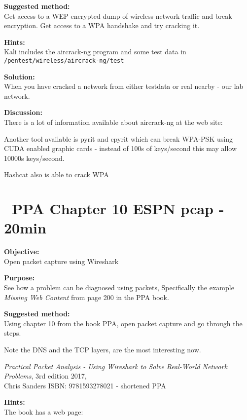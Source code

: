 \documentclass[a4paper,11pt,notitlepage]{report}
\begin{document}
{\bf Suggested method:}\\
Get access to a WEP encrypted dump of wireless network traffic and break encryption. Get access to a WPA handshake and try cracking it.


{\bf Hints:}\\
Kali includes the aircrack-ng program and some test data in \\
\verb+/pentest/wireless/aircrack-ng/test+

{\bf Solution:}\\
When you have cracked a network from either testdata or real nearby - our lab network.

{\bf Discussion:}\\
There is a lot of information available about aircrack-ng at the web site:\\

Another tool available is pyrit and cpyrit which can break WPA-PSK using CUDA enabled graphic cards - instead of 100s of keys/second this may allow 10000s keys/second.

Hashcat also is able to crack WPA 



\chapter{\faInfoCircle\ PPA Chapter 10 ESPN pcap - 20min}
\label{ex:espn-capture}


{\bf Objective:}\\
Open packet capture using Wireshark

{\bf Purpose:}\\
See how a problem can be diagnosed using packets, Specifically the example \emph{Missing Web Content} from page 200 in the PPA book.

{\bf Suggested method:}\\
Using chapter 10 from the book PPA, open packet capture and go through the steps.

Note the DNS and the TCP layers, are the most interesting now.

\emph{Practical Packet Analysis - Using Wireshark to Solve Real-World Network Problems}, 3rd edition 2017, \\
Chris Sanders ISBN: 9781593278021 - shortened PPA

{\bf Hints:}\\
The book has a web page:\\
\end{document}
